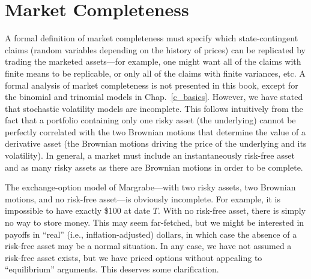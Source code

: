 \section{Market Completeness}\label{s_margrabecomplete}

A formal definition of market completeness  must specify which state-contin\-gent claims (random variables depending on the history of prices) can be replicated by trading the marketed assets---for example, one might want all of the claims with finite means to be replicable, or only all of the claims with finite variances, etc.  A formal analysis of market completeness is not presented in this book, except for the binomial and trinomial models in Chap.~\ref{c_basics}.   However, we have stated that stochastic volatility models are incomplete.  This follows intuitively from the fact that a portfolio containing only one risky asset (the underlying) cannot be perfectly correlated with the two Brownian motions that determine the value of a derivative asset (the Brownian motions driving the price of the underlying and its volatility).  In general, a market must include an instantaneously risk-free asset and as many risky assets as there are Brownian motions in order to be complete.  

The exchange-option model of Margrabe---with two risky assets, two Brownian motions, and no risk-free asset---is obviously incomplete.   For example, it is impossible to have exactly \$100 at date $T$.  With no risk-free asset, there is simply no way to store money.  This may seem far-fetched, but we might be interested in payoffs in ``real'' (i.e., inflation-adjusted) dollars, in which case the absence of a risk-free asset may be a normal situation.   In any case, we have not assumed a risk-free asset exists, but we have priced options without appealing to ``equilibrium'' arguments.  This deserves some clarification.

